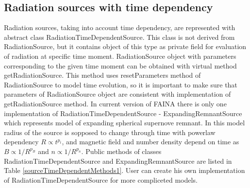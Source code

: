 \begin{small}
\begin{xtabular}{|p{0.5\textwidth}|p{0.5\textwidth}|}
		\hline
	\end{xtabular}
\end{small}

\subsection{Radiation sources with time dependency}\label{timeDependentSource}

Radiation sources, taking into account time dependency, are represented with abstract class RadiationTimeDependentSource. This class is not derived from RadiationSource, but it contains object of this type as private field for evaluation of radiation at specific time moment. RadiationSource object with parameters corresponding to the given time moment can be obtained with virtual method getRadiationSource. This method uses resetParameters method of RadiationSource to model time evolution, so it is important to make sure that parameters of RadiationSource object are consistent with implementation of getRadiationSource method. In current version of FAINA there is only one implementation of RadiationTimeDependentSource - ExpandingRemnantSource which represents model of expanding spherical supernove remnant. In this model radius of the source is sopposed to change through time with powerlaw dependency $R\propto t^{p_t}$, and magnetic field and number density depend on time as $B\propto1/R^{p_B}$ and $n\propto1/R^{p_n}$. Public methods of classes RadiationTimeDependentSource and ExpandingRemnantSource are listed in Table \ref{sourceTimeDependentMethods1}. User can create his own implementation of RadiationTimeDependentSource for more compliceted models.

